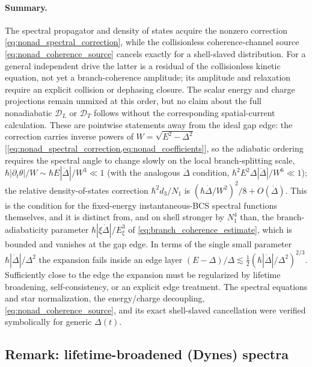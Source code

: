 \documentclass[
  aps,
  prb,
  preprint,
  superscriptaddress,
  longbibliography,
  nofootinbib
]{revtex4-2}
\newcommand{\DOS}{N_1}
\begin{document}
\paragraph{Summary.} The spectral propagator and density of states acquire
the nonzero correction \cref{eq:nonad_spectral_correction}, while the
collisionless coherence-channel source
\cref{eq:nonad_coherence_source} cancels exactly for a shell-slaved
distribution. For a general independent drive the latter is a residual of
the collisionless kinetic equation, not yet a branch-coherence amplitude;
its amplitude and relaxation require an explicit collision or dephasing
closure. The scalar energy and charge projections remain unmixed at this
order, but no claim about the full nonadiabatic \(\mathcal D_L\) or
\(\mathcal D_T\) follows without the corresponding spatial-current
calculation.
These are pointwise statements away from the ideal gap edge: the correction
carries inverse powers of \(W=\sqrt{E^2-\Delta^2}\)
[\cref{eq:nonad_spectral_correction,eq:nonad_coefficients}], so the adiabatic
ordering requires the spectral angle to change slowly on the local
branch-splitting scale,
\(\hbar|\partial_t\theta|/W\sim\hbar E|\dot\Delta|/W^3\ll1\) (with the
analogous \(\ddot\Delta\) condition,
\(\hbar^2E^2\Delta|\ddot\Delta|/W^6\ll1\)); the relative density-of-states
correction \(\hbar^2d_3/\DOS\) is
\((\hbar\dot\Delta/W^2)^2/8+O(\ddot\Delta)\). This is the condition for the
fixed-energy instantaneous-BCS spectral functions themselves, and it is
distinct from, and on shell stronger by \(\DOS^4\) than, the
branch-adiabaticity parameter \(\hbar|\xi\dot\Delta|/E_\xi^3\) of
\cref{eq:branch_coherence_estimate}, which is bounded and vanishes at the
gap edge. In terms of the single small parameter
\(\hbar|\dot\Delta|/\Delta^2\) the expansion fails inside an edge layer
\((E-\Delta)/\Delta\lesssim\tfrac12(\hbar|\dot\Delta|/\Delta^2)^{2/3}\).
Sufficiently close to the edge the
expansion must be regularized by lifetime broadening, self-consistency, or
an explicit edge treatment. The spectral equations and star normalization,
the energy/charge decoupling, \cref{eq:nonad_coherence_source}, and its exact
shell-slaved cancellation were verified symbolically for generic
\(\Delta(t)\).

\subsection{Remark: lifetime-broadened (Dynes) spectra}
\label{app:dynes_remark}
\end{document}

